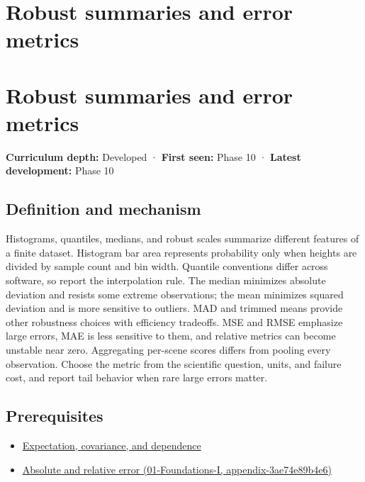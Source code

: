 \hypertarget{appendix-bcc44e9d3d02}{}
\section*{Robust summaries and error metrics}
\section{Robust summaries and error metrics}\label{appendix-bcc44e9d3d02-robust-summaries-and-error-metrics}

\textbf{Curriculum depth:} Developed · \textbf{First seen:} Phase 10 · \textbf{Latest development:} Phase 10

\subsection{Definition and mechanism}\label{appendix-bcc44e9d3d02-definition-and-mechanism}

Histograms, quantiles, medians, and robust scales summarize different features of a finite dataset. Histogram bar area represents probability only when heights are divided by sample count and bin width. Quantile conventions differ across software, so report the interpolation rule. The median minimizes absolute deviation and resists some extreme observations; the mean minimizes squared deviation and is more sensitive to outliers. MAD and trimmed means provide other robustness choices with efficiency tradeoffs. MSE and RMSE emphasize large errors, MAE is less sensitive to them, and relative metrics can become unstable near zero. Aggregating per-scene scores differs from pooling every observation. Choose the metric from the scientific question, units, and failure cost, and report tail behavior when rare large errors matter.

\subsection{Prerequisites}\label{appendix-bcc44e9d3d02-prerequisites}

\begin{itemize}
\tightlist
\item
  \hyperref[appendix-54c383df9992]{Expectation, covariance, and dependence}
\item
  \href{../01-Foundations-I/main.pdf\#nameddest=appendix-3ae74e89b4e6}{Absolute and relative error (01-Foundations-I, appendix-3ae74e89b4e6)}
\end{itemize}

